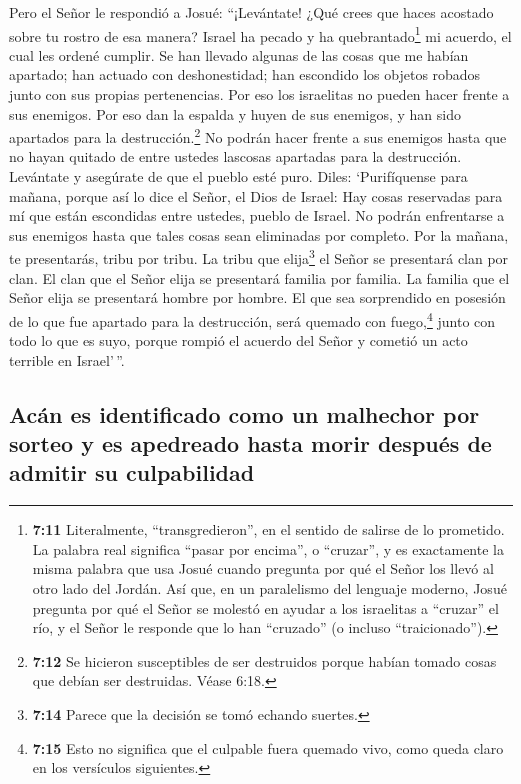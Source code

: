  Pero el Señor le respondió a Josué: ``¡Levántate! ¿Qué
crees que haces acostado sobre tu rostro de esa manera? 
Israel ha pecado y ha quebrantado\footnote{\textbf{7:11} Literalmente,
  ``transgredieron'', en el sentido de salirse de lo prometido. La
  palabra real significa ``pasar por encima'', o ``cruzar'', y es
  exactamente la misma palabra que usa Josué cuando pregunta por qué el
  Señor los llevó al otro lado del Jordán. Así que, en un paralelismo
  del lenguaje moderno, Josué pregunta por qué el Señor se molestó en
  ayudar a los israelitas a ``cruzar'' el río, y el Señor le responde
  que lo han ``cruzado'' (o incluso ``traicionado'').} mi acuerdo, el
cual les ordené cumplir. Se han llevado algunas de las cosas que me
habían apartado; han actuado con deshonestidad; han escondido los
objetos robados junto con sus propias pertenencias.  Por
eso los israelitas no pueden hacer frente a sus enemigos. Por eso dan la
espalda y huyen de sus enemigos, y han sido apartados para la
destrucción.\footnote{\textbf{7:12} Se hicieron susceptibles de ser
  destruidos porque habían tomado cosas que debían ser destruidas. Véase
  6:18.} No podrán hacer frente a sus enemigos hasta que no hayan
quitado de entre ustedes lascosas apartadas para la destrucción.
 Levántate y asegúrate de que el pueblo esté puro. Diles:
`Purifíquense para mañana, porque así lo dice el Señor, el Dios de
Israel: Hay cosas reservadas para mí que están escondidas entre ustedes,
pueblo de Israel. No podrán enfrentarse a sus enemigos hasta que tales
cosas sean eliminadas por completo.  Por la mañana, te
presentarás, tribu por tribu. La tribu que elija\footnote{\textbf{7:14}
  Parece que la decisión se tomó echando suertes.} el Señor se
presentará clan por clan. El clan que el Señor elija se presentará
familia por familia. La familia que el Señor elija se presentará hombre
por hombre.  El que sea sorprendido en posesión de lo que
fue apartado para la destrucción, será quemado con fuego,\footnote{\textbf{7:15}
  Esto no significa que el culpable fuera quemado vivo, como queda claro
  en los versículos siguientes.} junto con todo lo que es suyo, porque
rompió el acuerdo del Señor y cometió un acto terrible en Israel'\,''.

\hypertarget{acuxe1n-es-identificado-como-un-malhechor-por-sorteo-y-es-apedreado-hasta-morir-despuuxe9s-de-admitir-su-culpabilidad}{%
\subsection{Acán es identificado como un malhechor por sorteo y es
apedreado hasta morir después de admitir su
culpabilidad}\label{acuxe1n-es-identificado-como-un-malhechor-por-sorteo-y-es-apedreado-hasta-morir-despuuxe9s-de-admitir-su-culpabilidad}}

